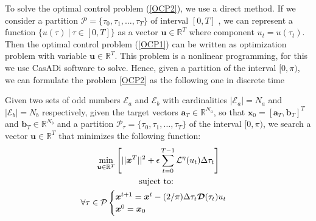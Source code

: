 To solve the optimal control problem (\ref{OCP2}), we use a direct method. 
%
If we consider a partition $\mathcal{P} = \{\tau_0,\tau_1,\dots,\tau_{T}\}$ of interval $[0,T]$ , we can represent a function $\{ u(\tau) \ | \ \tau \in [0,T]\}$ as a vector $\bm{u} \in \mathbb{R}^{T}$ where component $u_t = u(\tau_t)$. 
%
Then the optimal control problem (\ref{OCP1}) can be written as optimization problem with variable $\bm{u} \in \mathbb{R}^{T}$. This problem is a nonlinear programming, for this we use CasADi software to solve. 
%
Hence, given a partition of the interval $[0,\pi)$, we can formulate the problem \ref{OCP2} as the following one in discrete time
\newline

\begin{problem}
Given two sets of odd numbers $\mathcal{E}_a$ and $\mathcal{E}_b$ with cardinalities $|\mathcal{E}_a| = N_a$ and $|\mathcal{E}_b| = N_b$ respectively, given the target vectors $\bm{a}_T  \in \mathbb{R}^{N_a}$, so that $\bm{x}_0 = [\bm{a}_T,\bm{b}_T]^T$ and $\bm{b}_T \in \mathbb{R}^{N_b}$ and a partition $\mathcal{P}_\tau = \{\tau_0,\tau_1,\dots,\tau_{T}\}$ of the interval $[0,\pi)$, we search a vector $\bm{u} \in \mathbb{R}^{T}$ that minimizes the following function:
\begin{gather}
        \min_{\bm{u} \in \mathbb{R}^{T} } 
        \Bigg[ 
        || \bm{x}^{T}||^2
        + \epsilon  \sum_{t=0}^{T-1} \mathcal{L}^\eta(u_{t}) \Delta\tau_t  \Bigg]  \\
        \notag \text{suject to: } \\
        \forall \tau \in \mathcal{P} \begin{cases}
            \bm{x}^{t+1} = \bm{x}^{t} - (2/\pi)\Delta \tau_t \bm{\mathcal{D}}(\tau_t)u_t \\
            \bm{x}^0 = \bm{x}_0
        \end{cases} 
\end{gather}
\end{problem}
